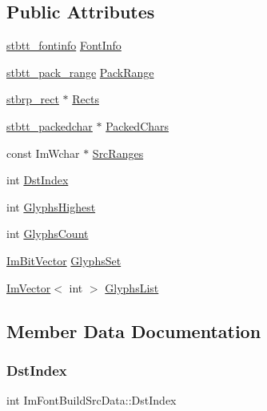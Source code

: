 \subsection*{Public Attributes}
\begin{DoxyCompactItemize}
\item 
\hyperlink{structstbtt__fontinfo}{stbtt\+\_\+fontinfo} \hyperlink{structImFontBuildSrcData_aa7499553235c2f084be3d2e2e030c3cc}{Font\+Info}
\item 
\hyperlink{structstbtt__pack__range}{stbtt\+\_\+pack\+\_\+range} \hyperlink{structImFontBuildSrcData_a98c6b58804c9be957ea6ce5b1732ad52}{Pack\+Range}
\item 
\hyperlink{structstbrp__rect}{stbrp\+\_\+rect} $\ast$ \hyperlink{structImFontBuildSrcData_a918baffa45001ec6ba866ad18a338969}{Rects}
\item 
\hyperlink{structstbtt__packedchar}{stbtt\+\_\+packedchar} $\ast$ \hyperlink{structImFontBuildSrcData_a7c85b2866a23a42357f19c05df2b7f3f}{Packed\+Chars}
\item 
const Im\+Wchar $\ast$ \hyperlink{structImFontBuildSrcData_a30187b934b16d7bef600887f1cc6614f}{Src\+Ranges}
\item 
int \hyperlink{structImFontBuildSrcData_a1fa5c70e2d29e53743557d55050ab912}{Dst\+Index}
\item 
int \hyperlink{structImFontBuildSrcData_a40ce6c1a652c3d3c67d094e064691da1}{Glyphs\+Highest}
\item 
int \hyperlink{structImFontBuildSrcData_a73600dcc4e6c8d6b499c032c4ed0e823}{Glyphs\+Count}
\item 
\hyperlink{structImBitVector}{Im\+Bit\+Vector} \hyperlink{structImFontBuildSrcData_ad767ca332169ff5df851170eb970b96a}{Glyphs\+Set}
\item 
\hyperlink{structImVector}{Im\+Vector}$<$ int $>$ \hyperlink{structImFontBuildSrcData_ae4d653fb221fc19a30a2117f73043377}{Glyphs\+List}
\end{DoxyCompactItemize}


\subsection{Member Data Documentation}
\mbox{\label{structImFontBuildSrcData_a1fa5c70e2d29e53743557d55050ab912}} 
\subsubsection{\texorpdfstring{Dst\+Index}{DstIndex}}
{\footnotesize\ttfamily int Im\+Font\+Build\+Src\+Data\+::\+Dst\+Index}

